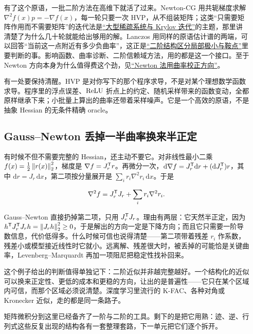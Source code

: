 有了这个原语，一批二阶方法在高维下就活了过来。Newton-CG 用共轭梯度求解 \(\nabla^2f(x)p=-\nabla f(x)\)，每一轮只要一次 HVP，从不组装矩阵；这类``只需要矩阵作用而不需要矩阵''的迭代法是\hyperref[sec:08-Numerical-Analysis/05-Numerical-Linear-Algebra/04]{``大型稀疏系统与 Krylov 迭代''}的主题，那里讲清楚了为什么几十轮就能给出够用的解。Lanczos 用同样的原语估计谱的两端，可以回答``当前这一点附近有多少负曲率''，这正是\hyperref[sec:09-Convex-Optimization/08-Nonconvex-and-Stochastic-Optimization/02]{``二阶结构区分局部极小与鞍点''}里要判断的事。影响函数、曲率诊断、二阶信赖域方法，用的都是这一个接口。至于 Newton 方向本身为什么值得费这个劲，见\hyperref[sec:09-Convex-Optimization/06-Optimization-Algorithms/02]{``Newton 法用曲率校正方向''}。

有一处要保持清醒。HVP 是对你写下的那个程序求导，不是对某个理想数学函数求导。程序里的浮点误差、\(\operatorname{ReLU}\) 折点上的约定、随机采样带来的函数变动，全都原样继承下来；小批量上算出的曲率还带着采样噪声。它是一个高效的原语，不是抽象 Hessian 的无条件精确 oracle。

\subsection{Gauss--Newton 丢掉一半曲率换来半正定}

有时候不但不需要完整的 Hessian，还主动不要它。对非线性最小二乘 \(f(x)=\tfrac12\left\lVert r(x)\right\rVert_2^2\)，梯度是 \(\nabla f=J_r^{\mathsf{T}}r\)。再微分一次，\(\mathrm d\nabla f=J_r^{\mathsf{T}}\mathrm dr+(\mathrm dJ_r^{\mathsf{T}})r\)，其中 \(\mathrm dr=J_r\,\mathrm dx\)，第二项按分量展开是 \(\sum_ir_i\nabla^2r_i\,\mathrm dx\)。于是

\[
\nabla^2f=J_r^{\mathsf{T}}J_r+\sum_ir_i\nabla^2r_i.
\]

Gauss--Newton 直接扔掉第二项，只用 \(J_r^{\mathsf{T}}J_r\)。理由有两层：它天然半正定，因为 \(h^{\mathsf{T}}J_r^{\mathsf{T}}J_rh=\left\lVert J_rh\right\rVert_2^2\ge0\)，于是解出的方向一定是下降方向；而且它只需要一阶导数信息，代价低得多。什么时候可信也说得清楚——第二项带着残差 \(r_i\) 作系数，残差小或模型接近线性时它就小。远离解、残差很大时，被丢掉的可能恰是关键曲率，Levenberg--Marquardt 再加一项阻尼把稳定性找补回来。

这个例子给出的判断值得单独记下：二阶近似并非越完整越好。一个结构化的近似可以换来正定性、更低的成本和更稳的方向，让出的是普遍性——它只在某个区域内可信，而那个区域必须说清楚。深度学习里流行的 K-FAC、各种对角或 Kronecker 近似，走的都是同一条路子。

矩阵微积分到这里已经备齐了一阶与二阶的工具。剩下的是把它用熟：迹、逆、行列式这些反复出现的结构各有一套整理套路，下一单元把它们逐个拆开。
